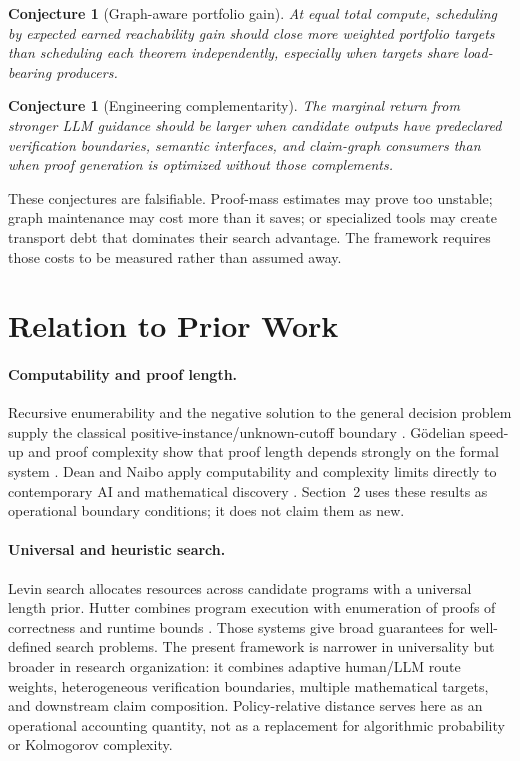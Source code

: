 \documentclass[11pt]{article}
\newtheorem{conjecture}[definition]{Conjecture}
\begin{document}
\begin{conjecture}[Graph-aware portfolio gain]\label{conj:graph-portfolio}
At equal total compute, scheduling by expected earned reachability gain should
close more weighted portfolio targets than scheduling each theorem
independently, especially when targets share load-bearing producers.
\end{conjecture}

\begin{conjecture}[Engineering complementarity]\label{conj:engineering-complementarity}
The marginal return from stronger LLM guidance should be larger when candidate
outputs have predeclared verification boundaries, semantic interfaces, and
claim-graph consumers than when proof generation is optimized without those
complements.
\end{conjecture}

These conjectures are falsifiable.  Proof-mass estimates may prove too
unstable; graph maintenance may cost more than it saves; or specialized tools
may create transport debt that dominates their search advantage.  The
framework requires those costs to be measured rather than assumed away.

\section{Relation to Prior Work}

\paragraph{Computability and proof length.}
Recursive enumerability and the negative solution to the general decision
problem supply the classical positive-instance/unknown-cutoff boundary
\citep{church1936,turing1936}.  Gödelian speed-up and proof complexity show
that proof length depends strongly on the formal system
\citep{godel1936,cookreckhow1979}.  Dean and Naibo apply computability and
complexity limits directly to contemporary AI and mathematical discovery
\citep{dean2025difficulty}.  Section~2 uses these results as operational
boundary conditions; it does not claim them as new.

\paragraph{Universal and heuristic search.}
Levin search allocates resources across candidate programs with a universal
length prior.  Hutter combines program execution with enumeration of proofs of
correctness and runtime bounds \citep{levin1973,hutter2002}.  Those systems
give broad guarantees for well-defined search problems.  The present framework
is narrower in universality but broader in research organization: it combines
adaptive human/LLM route weights, heterogeneous verification boundaries,
multiple mathematical targets, and downstream claim composition.
Policy-relative distance serves here as an operational accounting quantity,
not as a replacement for algorithmic probability or Kolmogorov complexity.
\end{document}

